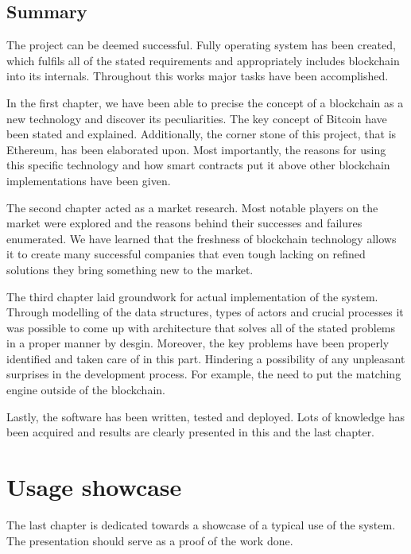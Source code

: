 \documentclass[a4paper,12pt,twoside,openany]{report}
\begin{document}
\section{Summary}

The project can be deemed successful. Fully operating system has been created, which fulfils all of the stated requirements and appropriately includes blockchain into its internals. Throughout this works major tasks have been accomplished.

In the first chapter, we have been able to precise the concept of a blockchain as a new technology and discover its peculiarities. The key concept of Bitcoin have been stated and explained. Additionally, the corner stone of this project, that is Ethereum, has been elaborated upon. Most importantly, the reasons for using this specific technology and how smart contracts put it above other blockchain implementations have been given.

The second chapter acted as a market research. Most notable players on the market were explored and the reasons behind their successes and failures enumerated. We have learned that the freshness of blockchain technology allows it to create many successful companies that even tough lacking on refined solutions they bring something new to the market.

The third chapter laid groundwork for actual implementation of the system. Through modelling of the data structures, types of actors and crucial processes it was possible to come up with architecture that solves all of the stated problems in a proper manner by desgin. Moreover, the key problems have been properly identified and taken care of in this part. Hindering a possibility of any unpleasant surprises in the development process. For example, the need to put the matching engine outside of the blockchain.

Lastly, the software has been written, tested and deployed. Lots of knowledge has been acquired and results are clearly presented in this and the last chapter.

\chapter{Usage showcase}

The last chapter is dedicated towards a showcase of a typical use of the system. The presentation should serve as a proof of the work done.
\end{document}
